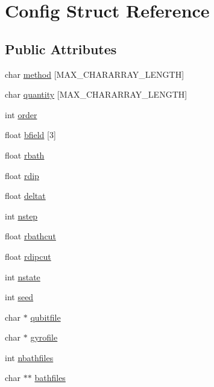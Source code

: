 \hypertarget{structConfig}{\section{Config Struct Reference}
\label{structConfig}
}
\subsection*{Public Attributes}
\begin{DoxyCompactItemize}
\item 
char \hyperlink{structConfig_a73d927bf5bdb0f39d024b23dc66f0c1c}{method} \mbox{[}M\-A\-X\-\_\-\-C\-H\-A\-R\-A\-R\-R\-A\-Y\-\_\-\-L\-E\-N\-G\-T\-H\mbox{]}
\item 
char \hyperlink{structConfig_a408cf9618ed41aefd0b0c323f57e0730}{quantity} \mbox{[}M\-A\-X\-\_\-\-C\-H\-A\-R\-A\-R\-R\-A\-Y\-\_\-\-L\-E\-N\-G\-T\-H\mbox{]}
\item 
int \hyperlink{structConfig_a3a9071ea9a9409cefb8cbcea2184c879}{order}
\item 
float \hyperlink{structConfig_abf4c62b17ba762512fab9da0f1e193be}{bfield} \mbox{[}3\mbox{]}
\item 
float \hyperlink{structConfig_a79389333cffeb4063cf1d39e89234c57}{rbath}
\item 
float \hyperlink{structConfig_af9d5e3a3b185555cbe04ad12733612b1}{rdip}
\item 
float \hyperlink{structConfig_a6539de558079f55df76dce79c4079b33}{deltat}
\item 
int \hyperlink{structConfig_acd1675410784e93a9c9866de0c64807e}{nstep}
\item 
float \hyperlink{structConfig_a2eeef76fa44792c24c3320ff6b4d19c8}{rbathcut}
\item 
float \hyperlink{structConfig_a39b6cf20220772b2326ddf423bf3a3f7}{rdipcut}
\item 
int \hyperlink{structConfig_a91b2aadf805896022127036ded259e79}{nstate}
\item 
int \hyperlink{structConfig_a92ed038fd7676ed62640f59270a60545}{seed}
\item 
char $\ast$ \hyperlink{structConfig_a9f5ed3dfb6ae52627a94099cb837cfbf}{qubitfile}
\item 
char $\ast$ \hyperlink{structConfig_a735f7f25b0847d08468616025a27ffe5}{gyrofile}
\item 
int \hyperlink{structConfig_a26827d7c075042372d21965a827328c3}{nbathfiles}
\item 
char $\ast$$\ast$ \hyperlink{structConfig_afe80a72359e5fc90a5f0f16e9f1d357e}{bathfiles}
$$
\end{DoxyCompactItemize}
